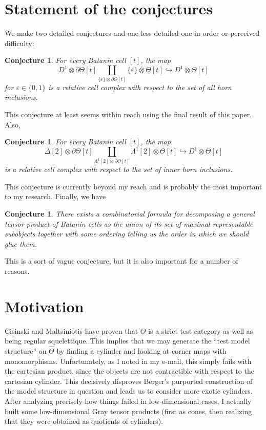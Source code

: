 \documentclass[10pt]{amsart}
\numberwithin{equation}{section}
\theoremstyle{plain}   %
\newtheorem{conjecture}[subsection]{Conjecture}
\theoremstyle{remark}
\theoremstyle{plain}
\newcommand{\cellset}{\ensuremath{\widehat{\Theta}}}
\begin{document}
\section{Statement of the conjectures}
We make two detailed conjectures and one less detailed one in order or perceived difficulty:
\begin{conjecture}
For every Batanin cell \([t]\), the map \[D^1\otimes \partial\Theta[t] \coprod_{\{\varepsilon\}\otimes \partial\Theta[t]} \{\varepsilon\} \otimes \Theta[t]\hookrightarrow D^1\otimes \Theta[t]\] for \(\varepsilon \in \{0,1\}\) is a relative cell complex with respect to the set of all horn inclusions.  
\end{conjecture}
This conjecture at least seems within reach using the final result of this paper.  Also,
\begin{conjecture}
For every Batanin cell \([t]\), the map \[\Delta[2]\otimes \partial\Theta[t] \coprod_{\Lambda^1[2]\otimes \partial\Theta[t]} \Lambda^1[2] \otimes \Theta[t]\hookrightarrow D^1\otimes \Theta[t]\] is a relative cell complex with respect to the set of inner horn inclusions.  
\end{conjecture}
This conjecture is currently beyond my reach and is probably the most important to my research. Finally, we have
\begin{conjecture} There exists a combinatorial formula for decomposing a general tensor product of Batanin cells as the union of its set of maximal representable subobjects together with some ordering telling us the order in which we should glue them. 
\end{conjecture} 
This is a sort of vague conjecture, but it is also important for a number of reasons.  

\section{Motivation}
Cisinski and Maltsiniotis have proven that \(\Theta\) is a strict test category as well as being regular squelettique.  This implies that we may generate the ``test model structure'' on \(\cellset\) by finding a cylinder and looking at corner maps with monomorphisms.  Unfortunately, as I noted in my e-mail, this simply fails with the cartesian product, since the objects are not contractible with respect to the cartesian cylinder.  This decisively disproves Berger's purported construction of the model structure in question and leads us to consider more exotic cylinders.  After analyzing precisely how things failed in low-dimensional cases, I actually built some low-dimensional Gray tensor products (first as cones, then realizing that they were obtained as quotients of cylinders).
\end{document}
